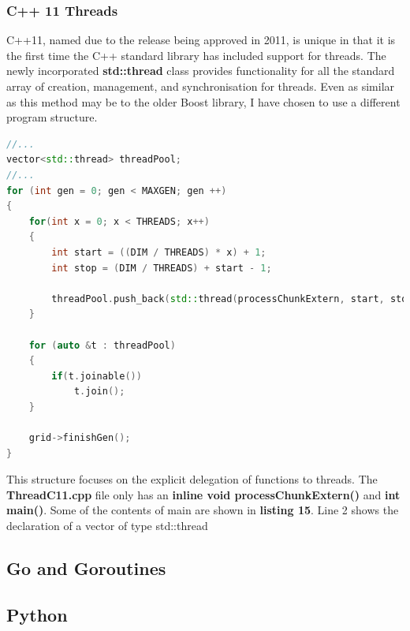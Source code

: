 \documentclass[11pt]{article} %
\begin{document}
\subsubsection{C++ 11 Threads}
C++11, named due to the release being approved in 2011, is unique in that it is the first time the C++ standard library has included support for threads. The newly incorporated {\bf std::thread} class provides functionality for all the standard array of creation, management, and synchronisation for threads. Even as similar as this method may be to the older Boost library, I have chosen to use a different program structure.
\begin{lstlisting}[language=c++, caption={Main game loop from C++ 11 implementation}]
//...    
vector<std::thread> threadPool;
//...
for (int gen = 0; gen < MAXGEN; gen ++)
{
    for(int x = 0; x < THREADS; x++)
    {
        int start = ((DIM / THREADS) * x) + 1;
        int stop = (DIM / THREADS) + start - 1;

        threadPool.push_back(std::thread(processChunkExtern, start, stop, grid));
    }
    
    for (auto &t : threadPool)
    {
        if(t.joinable())
            t.join();
    }
    
    grid->finishGen();
}
\end{lstlisting}
This structure focuses on the explicit delegation of functions to threads. The {\bf ThreadC11.cpp} file only has an {\bf inline void processChunkExtern()} and {\bf int main()}. Some of the contents of main are shown in {\bf listing 15}. Line 2 shows the declaration of a vector of type std::thread
\subsection{Go and Goroutines}
\subsection{Python}
\end{document}
